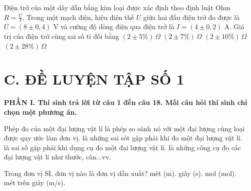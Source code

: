\begin{vd}
Điện trở của một dây dẫn bằng kim loại được xác định theo định luật Ohm $R = \frac{U}{I}$. Trong một mạch điện, hiệu điện thế $U$ giữa hai đầu điện trở đo được là $U = (8 \pm 0{,}4)\text{ V}$ và cường độ dòng điện qua điện trở là $I = (4 \pm 0{,}2)\text{ A}$. Giá trị của điện trở cùng sai số tỉ đối bằng
\choice
{$(2 \pm 5\%)\,\Omega$}
{$(2 \pm 7\%)\,\Omega$}
{\True $(2 \pm 10\%)\,\Omega$}
{$(2 \pm 28\%)\,\Omega$}
\end{vd}
\vspace{0.3cm}

\section*{C. ĐỀ LUYỆN TẬP SỐ 1}

\noindent\textbf{\large PHẦN I. Thí sinh trả lời từ câu 1 đến câu 18. Mỗi câu hỏi thí sinh chỉ chọn một phương án.}\par\vspace{0.2cm}
\begin{ex}
Phép đo của một đại lượng vật lí
\choice
{\True là phép so sánh nó với một đại lượng cùng loại được quy ước làm đơn vị.}
{là những sai sót gặp phải khi đo một đại lượng vật lí.}
{là sai số gặp phải khi dụng cụ đo một đại lượng vật lí.}
{là những công cụ đo các đại lượng vật lí như thước, cân...vv.}
\end{ex}

\begin{ex}
Trong đơn vị SI, đơn vị nào là đơn vị dẫn xuất?
\choice
{mét (m).}
{giây (s).}
{mol (mol).}
{\True mét trên giây (m/s).}
\end{ex}

